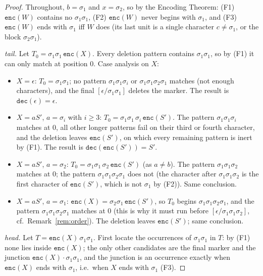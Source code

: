 \documentclass[runningheads,envcountsect]{llncs}
\begin{document}
\begin{proof}
    Throughout, $b = \sigma_1$ and $x = \sigma_2$, so by the Encoding Theorem: (F1) $\mathtt{enc}(W)$ contains no $\sigma_1\sigma_1$, (F2) $\mathtt{enc}(W)$ never begins with $\sigma_1$, and (F3) $\mathtt{enc}(W)$ ends with $\sigma_1$ iff $W$ does (its last unit is a single character $c \neq \sigma_1$, or the block $\sigma_2\sigma_1$).

    \emph{tail.} Let $T_0 = \sigma_1\sigma_1\,\mathtt{enc}(X)$. Every deletion pattern contains $\sigma_1\sigma_1$, so by (F1) it can only match at position $0$. Case analysis on $X$:
    \begin{itemize}
        \item $X = \epsilon$: $T_0 = \sigma_1\sigma_1$; no pattern $\sigma_1\sigma_1\sigma_i$ or $\sigma_1\sigma_1\sigma_2\sigma_1$ matches (not enough characters), and the final $[\epsilon/\sigma_1\sigma_1]$ deletes the marker. The result is $\mathtt{dec}(\epsilon) = \epsilon$.
        \item $X = aS'$, $a = \sigma_i$ with $i \ge 3$: $T_0 = \sigma_1\sigma_1\,\sigma_i\,\mathtt{enc}(S')$. The pattern $\sigma_1\sigma_1\sigma_i$ matches at $0$, all other longer patterns fail on their third or fourth character, and the deletion leaves $\mathtt{enc}(S')$, on which every remaining pattern is inert by (F1). The result is $\mathtt{dec}(\mathtt{enc}(S')) = S'$.
        \item $X = aS'$, $a = \sigma_2$: $T_0 = \sigma_1\sigma_1\,\sigma_2\,\mathtt{enc}(S')$ (as $a \neq b$). The pattern $\sigma_1\sigma_1\sigma_2$ matches at $0$; the pattern $\sigma_1\sigma_1\sigma_2\sigma_1$ does not (the character after $\sigma_1\sigma_1\sigma_2$ is the first character of $\mathtt{enc}(S')$, which is not $\sigma_1$ by (F2)). Same conclusion.
        \item $X = aS'$, $a = \sigma_1$: $\mathtt{enc}(X) = \sigma_2\sigma_1\,\mathtt{enc}(S')$, so $T_0$ begins $\sigma_1\sigma_1\sigma_2\sigma_1$, and the pattern $\sigma_1\sigma_1\sigma_2\sigma_1$ matches at $0$ (this is why it must run before $[\epsilon/\sigma_1\sigma_1\sigma_2]$, cf.\ Remark~\ref{rem:order}). The deletion leaves $\mathtt{enc}(S')$; same conclusion.
    \end{itemize}

    \emph{head.} Let $T = \mathtt{enc}(X)\,\sigma_1\sigma_1$. First locate the occurrences of $\sigma_1\sigma_1$ in $T$: by (F1) none lies inside $\mathtt{enc}(X)$; the only other candidates are the final marker and the junction $\mathtt{enc}(X)\cdot\sigma_1\sigma_1$, and the junction is an occurrence exactly when $\mathtt{enc}(X)$ ends with $\sigma_1$, i.e.\ when $X$ ends with $\sigma_1$ (F3).


\end{proof}
\end{document}
